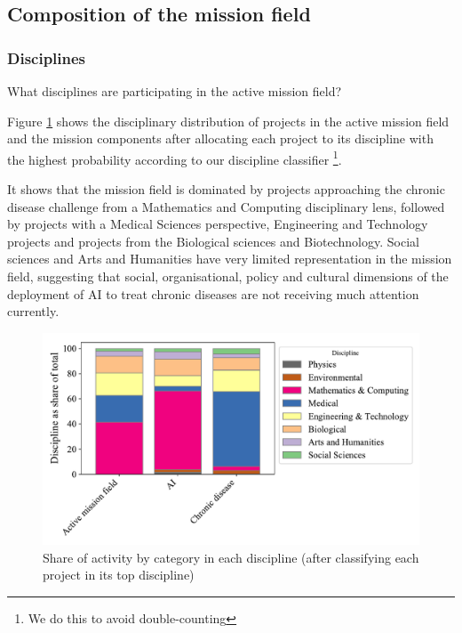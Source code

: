 \documentclass[11pt]{article}
\begin{document}
\subsection{Composition of the mission field}

\subsubsection{Disciplines}

What disciplines are participating in the active mission field?

Figure \ref{fig:disc_mix} shows the disciplinary distribution of projects in the active mission field and the mission components after allocating each project to its discipline with the highest probability according to our discipline classifier \footnote{We do this to avoid double-counting}. 

It shows that the mission field is dominated by projects approaching the chronic disease challenge from a Mathematics and Computing disciplinary lens, followed by projects with a Medical Sciences perspective, Engineering and Technology projects and projects from the Biological sciences and Biotechnology. Social sciences and Arts and Humanities have very limited representation in the mission field, suggesting that social, organisational, policy and cultural dimensions of the deployment of AI to treat chronic diseases are not receiving much attention currently.

\begin{figure}[!ht]
    \centering
    \includegraphics[width=\textwidth]{figures/fig_8_disciplines.pdf}
    \caption{Share of activity by category in each discipline (after classifying each project in its top discipline)}
    \label{fig:disc_mix}
\end{figure}
\end{document}
